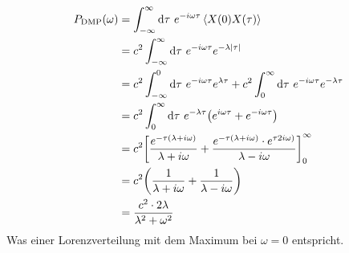 \documentclass[main.tex]{subfiles}
\begin{document}
\begin{align}
	P_\text{DMP}(\omega) &= \int_{-\infty}^{\infty} \dif \tau \ e^{-i \omega \tau} \expval{X(0)X(\tau)}\\
	&= c^2 \int_{-\infty}^{\infty} \dif \tau \ e^{-i \omega \tau}e^{-\lambda \abs{\tau}}\\
	&= c^2 \int_{-\infty}^{0} \dif \tau \ e^{-i \omega \tau}e^{\lambda \tau} + c^2 \int_{0}^{\infty} \dif \tau \ e^{-i \omega \tau}e^{-\lambda \tau}\\
	&= c^2 \int_{0}^{\infty} \dif \tau \ e^{-\lambda \tau} \qty(e^{i \omega \tau} + e^{-i \omega \tau})\\
	&= c^2 \qty[\frac{e^{-\tau(\lambda + i\omega)}}{\lambda + i\omega} + \frac{e^{-\tau(\lambda + i\omega)}\cdot e^{\tau 2 i \omega)}}{\lambda - i\omega}]_{0}^{\infty}\\
	&= c^2\qty(\frac{1}{\lambda + i\omega} + \frac{1}{\lambda - i\omega})\\
	&= \frac{c^2 \cdot 2\lambda}{\lambda^2 + \omega^2}
\end{align}
Was einer Lorenzverteilung mit dem Maximum bei \(\omega=0\) entspricht.

\end{document}
